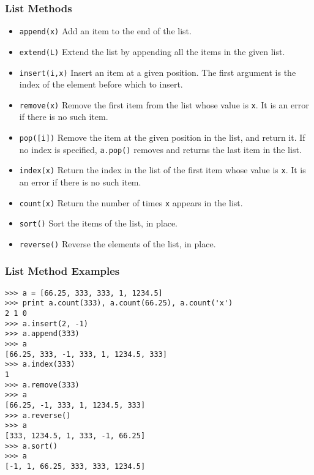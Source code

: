 \documentclass{beamer}
\begin{document}
\begin{frame}[fragile]
\frametitle{List Methods}
\footnotesize
\begin{itemize}
\item \texttt{append(x)} 
Add an item to the end of the list.
\item \texttt{extend(L)} Extend the list by appending all the items in the given list.
\item \texttt{insert(i,x)} Insert an item at a given position. The first argument is the index of the element before which to insert.
\item \texttt{remove(x)} Remove the first item from the list whose value is {\tt x}. It is an error if there is no such item.
\item {\tt pop([i])} Remove the item at the given position in the list, and return it. If no index is specified, \texttt{a.pop()} removes and returns the last item in the list. 
\item \texttt{index(x)} Return the index in the list of the first item whose value is {\tt x}. It is an error if there is no such item.
\item \texttt{count(x)} Return the number of times \texttt{x} appears in the list.
\item \texttt{sort()} Sort the items of the list, in place.
\item \texttt{reverse()} Reverse the elements of the list, in place.
\end{itemize}
\end{frame}


\begin{frame}[fragile]
\frametitle{List Method Examples}
\begin{block}{}
\scriptsize
\begin{verbatim}
>>> a = [66.25, 333, 333, 1, 1234.5] 
>>> print a.count(333), a.count(66.25), a.count('x') 
2 1 0 
>>> a.insert(2, -1) 
>>> a.append(333) 
>>> a 
[66.25, 333, -1, 333, 1, 1234.5, 333] 
>>> a.index(333)
1
>>> a.remove(333) 
>>> a 
[66.25, -1, 333, 1, 1234.5, 333] 
>>> a.reverse() 
>>> a 
[333, 1234.5, 1, 333, -1, 66.25] 
>>> a.sort() 
>>> a 
[-1, 1, 66.25, 333, 333, 1234.5]
\end{verbatim}
\end{block}
\end{frame}
\end{document}
